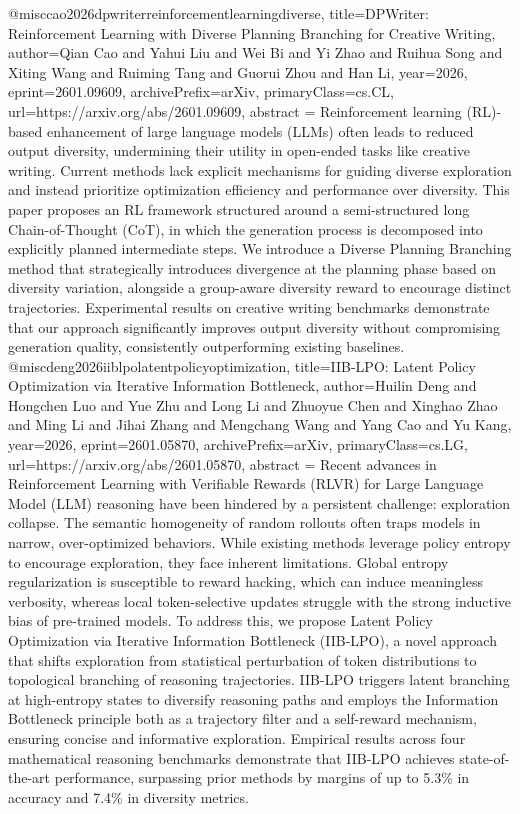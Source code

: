 {}@misc{cao2026dpwriterreinforcementlearningdiverse,
      title={DPWriter: Reinforcement Learning with Diverse Planning Branching for Creative Writing}, 
      author={Qian Cao and Yahui Liu and Wei Bi and Yi Zhao and Ruihua Song and Xiting Wang and Ruiming Tang and Guorui Zhou and Han Li},
      year={2026},
      eprint={2601.09609},
      archivePrefix={arXiv},
      primaryClass={cs.CL},
      url={https://arxiv.org/abs/2601.09609},
      abstract = {Reinforcement learning (RL)-based enhancement of large language models (LLMs) often leads to reduced output diversity, undermining their utility in open-ended tasks like creative writing. Current methods lack explicit mechanisms for guiding diverse exploration and instead prioritize optimization efficiency and performance over diversity. This paper proposes an RL framework structured around a semi-structured long Chain-of-Thought (CoT), in which the generation process is decomposed into explicitly planned intermediate steps. We introduce a Diverse Planning Branching method that strategically introduces divergence at the planning phase based on diversity variation, alongside a group-aware diversity reward to encourage distinct trajectories. Experimental results on creative writing benchmarks demonstrate that our approach significantly improves output diversity without compromising generation quality, consistently outperforming existing baselines.}
}@misc{deng2026iiblpolatentpolicyoptimization,
      title={IIB-LPO: Latent Policy Optimization via Iterative Information Bottleneck}, 
      author={Huilin Deng and Hongchen Luo and Yue Zhu and Long Li and Zhuoyue Chen and Xinghao Zhao and Ming Li and Jihai Zhang and Mengchang Wang and Yang Cao and Yu Kang},
      year={2026},
      eprint={2601.05870},
      archivePrefix={arXiv},
      primaryClass={cs.LG},
      url={https://arxiv.org/abs/2601.05870},
      abstract = {Recent advances in Reinforcement Learning with Verifiable Rewards (RLVR) for Large Language Model (LLM) reasoning have been hindered by a persistent challenge: exploration collapse. The semantic homogeneity of random rollouts often traps models in narrow, over-optimized behaviors. While existing methods leverage policy entropy to encourage exploration, they face inherent limitations. Global entropy regularization is susceptible to reward hacking, which can induce meaningless verbosity, whereas local token-selective updates struggle with the strong inductive bias of pre-trained models. To address this, we propose Latent Policy Optimization via Iterative Information Bottleneck (IIB-LPO), a novel approach that shifts exploration from statistical perturbation of token distributions to topological branching of reasoning trajectories. IIB-LPO triggers latent branching at high-entropy states to diversify reasoning paths and employs the Information Bottleneck principle both as a trajectory filter and a self-reward mechanism, ensuring concise and informative exploration. Empirical results across four mathematical reasoning benchmarks demonstrate that IIB-LPO achieves state-of-the-art performance, surpassing prior methods by margins of up to 5.3\% in accuracy and 7.4\% in diversity metrics.}
}
